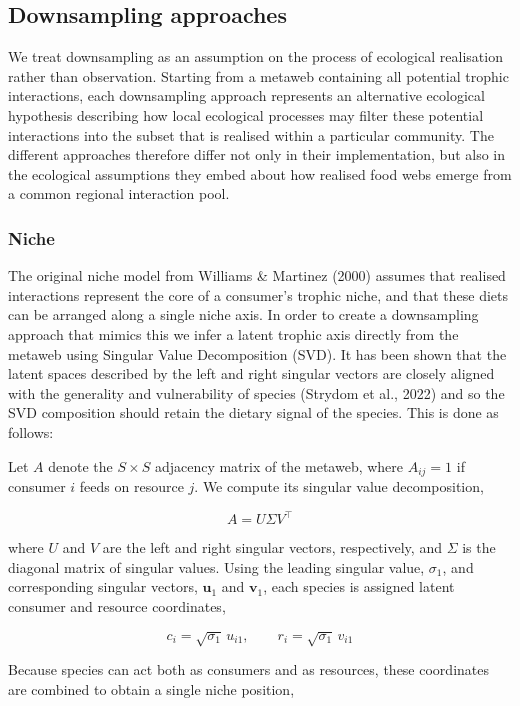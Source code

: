 \documentclass[
]{article}
\begin{document}
\subsection{Downsampling approaches}\label{sec-downsample}

We treat downsampling as an assumption on the process of ecological
realisation rather than observation. Starting from a metaweb containing
all potential trophic interactions, each downsampling approach
represents an alternative ecological hypothesis describing how local
ecological processes may filter these potential interactions into the
subset that is realised within a particular community. The different
approaches therefore differ not only in their implementation, but also
in the ecological assumptions they embed about how realised food webs
emerge from a common regional interaction pool.

\subsubsection{Niche}\label{niche}

The original niche model from Williams \& Martinez (2000) assumes that
realised interactions represent the core of a consumer's trophic niche,
and that these diets can be arranged along a single niche axis. In order
to create a downsampling approach that mimics this we infer a latent
trophic axis directly from the metaweb using Singular Value
Decomposition (SVD). It has been shown that the latent spaces described
by the left and right singular vectors are closely aligned with the
generality and vulnerability of species (Strydom et al., 2022) and so
the SVD composition should retain the dietary signal of the species.
This is done as follows:

Let \(A\) denote the \(S \times S\) adjacency matrix of the metaweb,
where \(A_{ij}=1\) if consumer \(i\) feeds on resource \(j\). We compute
its singular value decomposition,

\[
A = U \Sigma V^\top
\]

where \(U\) and \(V\) are the left and right singular vectors,
respectively, and \(\Sigma\) is the diagonal matrix of singular values.
Using the leading singular value, \(\sigma_1\), and corresponding
singular vectors, \(\mathbf{u}_1\) and \(\mathbf{v}_1\), each species is
assigned latent consumer and resource coordinates,

\[
c_i = \sqrt{\sigma_1}\,u_{i1}, \qquad r_i = \sqrt{\sigma_1}\,v_{i1}
\]

Because species can act both as consumers and as resources, these
coordinates are combined to obtain a single niche position,
\end{document}
